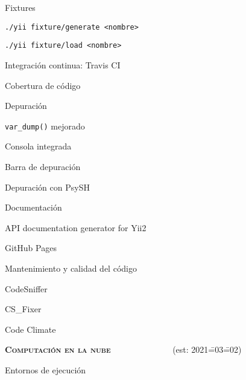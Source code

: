 \begin{longenum}
\begin{longenum}
\begin{longenum}
\begin{longenum}
\begin{longenum}
                \end{longenum}
                \item Fixtures
                \begin{longenum}
                    \item \texttt{./yii fixture/generate <nombre>}
                    \item \texttt{./yii fixture/load <nombre>}
                \end{longenum}
            \end{longenum}
            \item Integración continua: Travis CI
            \item Cobertura de código \opcional\
        \end{longenum}
        \item Depuración 
        \begin{longenum}
            \item \texttt{var\_dump()} mejorado
            \item Consola integrada
            \item Barra de depuración
            \item Depuración con PsySH \opcional\
        \end{longenum}
        \item Documentación
        \begin{longenum}
            \item API documentation generator for Yii2
            \item GitHub Pages
        \end{longenum}
        \item Mantenimiento y calidad del código
        \begin{longenum}
            \item CodeSniffer
            \item CS\_Fixer
            \item Code Climate
        \end{longenum}
    \end{longenum}
    \item \textbf{\textsc{Computación en la nube}} \ \ \ \ \ \ \ \ \ \ \ \ \ \ (est: 2021\==03\==02)
    \begin{longenum}
        \item Entornos de ejecución
        \begin{longenum}

\end{longenum}
\end{longenum}
\end{longenum}
